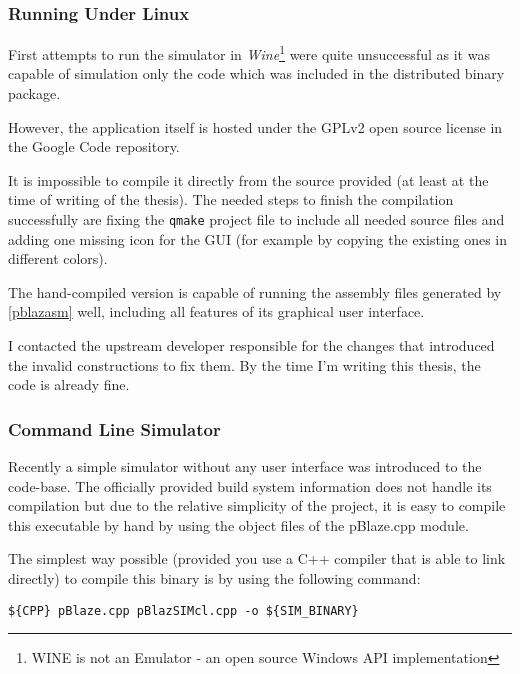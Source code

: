             \subsubsection{Running Under Linux}

            First attempts to run the simulator in \emph{Wine}\footnote{WINE is not an Emulator - an open source Windows API implementation} were quite unsuccessful as it was capable of simulation only the code which was included in the distributed binary package.

            However, the application itself is hosted under the GPLv2 open source license in the Google Code repository. 

            It is impossible to compile it directly from the source provided (at least at the time of writing of the thesis). The needed steps to finish the compilation successfully are fixing the \texttt{qmake} project file to include all needed source files and adding one missing icon for the GUI (for example by copying the existing ones in different colors).

            The hand-compiled version is capable of running the assembly files generated by \ref{pblazasm} well, including all features of its graphical user interface.

            I contacted the upstream developer responsible for the changes that introduced the invalid constructions to fix them. By the time I'm writing this thesis, the code is already fine.

            \subsubsection{Command Line Simulator}

            Recently a simple simulator without any user interface was introduced to the code-base. The officially provided build system information does not handle its compilation but due to the relative simplicity of the project, it is easy to compile this executable by hand by using the object files of the pBlaze.cpp module.

            The simplest way possible (provided you use a C++ compiler that is able to link directly) to compile this binary is by using the following command:

            \begin{center}
                \texttt{\$\{CPP\} pBlaze.cpp pBlazSIMcl.cpp -o \$\{SIM\_BINARY\}}
            \end{center}

